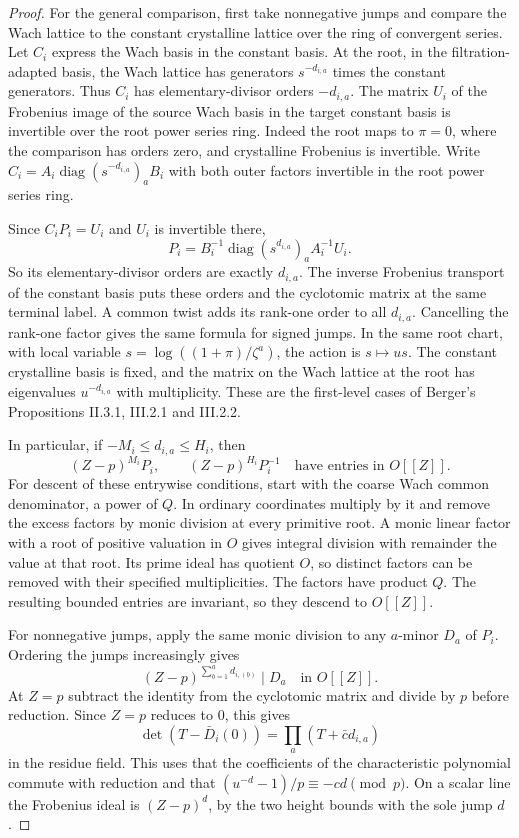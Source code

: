 \begin{proof}
For the general comparison, first take nonnegative jumps and
compare the Wach lattice to the constant crystalline lattice
over the ring of convergent series. Let \(C_i\) express the
Wach basis in the constant basis. At the root, in the
filtration-adapted basis, the Wach lattice has generators
\(s^{-d_{i,a}}\) times the constant generators. Thus \(C_i\)
has elementary-divisor orders \(-d_{i,a}\). The matrix \(U_i\)
of the Frobenius image of the source Wach basis in the target
constant basis is invertible over the root power series ring.
Indeed the root maps to \(\pi=0\), where the comparison has
orders zero, and crystalline Frobenius is invertible.
Write
\(C_i=A_i\operatorname{diag}(s^{-d_{i,a}})_a B_i\) with both
outer factors invertible in the root power series ring.

Since
\(C_iP_i=U_i\) and \(U_i\) is invertible there,
\[
       P_i=B_i^{-1}\operatorname{diag}(s^{d_{i,a}})_a
                               A_i^{-1}U_i .
\]
So its elementary-divisor orders are exactly \(d_{i,a}\).
The inverse Frobenius transport of the constant basis puts these
orders and the cyclotomic matrix at the same terminal label.
A common twist adds its rank-one order to all \(d_{i,a}\).
Cancelling the rank-one factor gives the same formula for signed jumps.
In the same root chart, with local variable
\(s=\log((1+\pi)/\zeta^a)\), the action is \(s\mapsto us\).
The constant crystalline basis is fixed, and the matrix on the
Wach lattice at the root has eigenvalues \(u^{-d_{i,a}}\)
with multiplicity. These are the first-level cases of
Berger's Propositions II.3.1, III.2.1 and III.2.2.
\cite{berger-wach,dousmanis-wach}\label{cor:cut-wach-models-1}

In particular, if \(-M_i\le d_{i,a}\le H_i\), then
\[
 (Z-p)^{M_i}P_i,\qquad (Z-p)^{H_i}P_i^{-1}
                \quad\text{have entries in }O[[Z]].
\]
For descent of these entrywise conditions, start with the
coarse Wach common denominator, a power of \(Q\). In ordinary
coordinates multiply by it and remove the excess factors by
monic division at every primitive root. A monic linear factor
with a root of positive valuation in \(O\) gives integral
division with remainder the value at that root. Its prime ideal
has quotient \(O\), so distinct factors can be removed with their
specified multiplicities. The factors have product \(Q\).
The resulting bounded entries are invariant, so they descend to
\(O[[Z]]\).

For nonnegative jumps, apply the same monic division to any \(a\)-minor \(D_a\) of \(P_i\). Ordering the jumps increasingly gives
\[
 (Z-p)^{\sum_{b=1}^{a}d_{i,(b)}}\mid D_a\quad\text{in }O[[Z]].
\]
At \(Z=p\) subtract the identity
from the cyclotomic matrix and divide by \(p\) before reduction.
Since \(Z=p\) reduces to \(0\), this gives
\[
     \det(T-\bar D_i(0))=\prod_a(T+\bar c d_{i,a})
\]
in the residue field. This uses that the coefficients
of the characteristic polynomial commute with reduction and
that \((u^{-d}-1)/p\equiv-cd\pmod p\). On a scalar line
the Frobenius ideal is \((Z-p)^d\), by the two height bounds
with the sole jump \(d\).
\end{proof}

